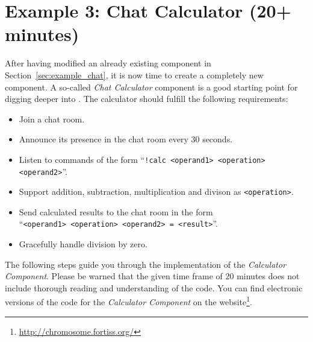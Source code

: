 %
% 
%
%
%

\section{Example 3: Chat Calculator (20+ minutes)}
\label{sec:example_chatcalculator}

After having modified an already existing component in Section~\ref{sec:example_chat},
it is now time to create a completely new component.
%
A so-called \emph{Chat Calculator} component is a good starting point for digging deeper into \xme.
%
The calculator should fulfill the following requirements:
\begin{itemize}
	\item Join a chat room.
	\item Announce its presence in the chat room every 30 seconds.
	\item Listen to commands of the form ``\verb|!calc <operand1> <operation> <operand2>|''.
	\item Support addition, subtraction, multiplication and divison as \verb|<operation>|.
	\item Send calculated results to the chat room in the form\\
		``\verb|<operand1> <operation> <operand2> = <result>|''.
	\item Gracefully handle division by zero.
\end{itemize}

The following steps guide you through the implementation of the \emph{Calculator Component}.
Please be warned that the given time frame of 20 minutes does not include thorough reading and understanding of the code.
You can find electronic versions of the code for the \emph{Calculator Component} on the \xme website\footnote{%
\url{http://chromosome.fortiss.org/}}.

